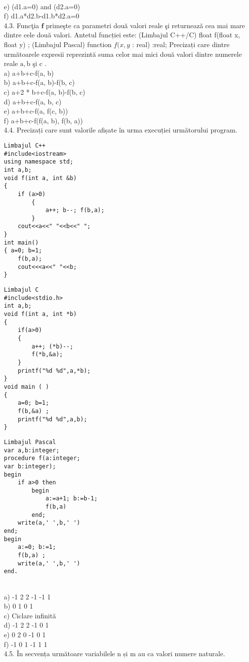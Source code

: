 \\
e) (d1.a=0) and (d2.a=0)
\\
f) d1.a*d2.b-d1.b*d2.a=0
\\
4.3. Funcţia $\mathbf{f}$ primeşte ca parametri două valori reale şi returnează cea mai mare dintre cele două valori. Antetul funcției este:
(Limbajul C++/C) float f(float x, float y) ;
(Limbajul Pascal) function $f(x, y$ : real) :real;
Precizați care dintre următoarele expresii reprezintă suma celor mai mici două valori dintre numerele reale $\mathrm{a}, \mathrm{b}$ şi c .
\\
a) a+b+c-f(a, b)
\\
b) a+b+c-f(a, b)-f(b, c)
\\
c) a+2 * b+c-f(a, b)-f(b, c)
\\
d) a+b+c-f(a, b, c)
\\
e) a+b+c-f(a, f(c, b))
\\
f) a+b+c-f(f(a, b), f(b, a))
\\
4.4. Precizați care sunt valorile afișate în urma execuției următorului program.
\begin{verbatim}
Limbajul C++
#include<iostream>
using namespace std;
int a,b;
void f(int a, int &b)
{
    if (a>0)
        {
            a++; b--; f(b,a);
        }
    cout<<a<<" "<<b<<" ";
}
int main()
{ a=0; b=1;
    f(b,a);
    cout<<<a<<" "<<b;
}
\end{verbatim}
\begin{verbatim}
Limbajul C
#include<stdio.h>
int a,b;
void f(int a, int *b)
{
    if(a>0)
    {
        a++; (*b)--;
        f(*b,&a);
    }
    printf("%d %d",a,*b);
}
void main ( )
{
    a=0; b=1;
    f(b,&a) ;
    printf("%d %d",a,b);
}
\end{verbatim}
\begin{verbatim}
Limbajul Pascal
var a,b:integer;
procedure f(a:integer;
var b:integer);
begin
    if a>0 then
        begin
            a:=a+1; b:=b-1;
            f(b,a)
        end;
    write(a,' ',b,' ')
end;
begin
    a:=0; b:=1;
    f(b,a) ;
    write(a,' ',b,' ')
end.
\end{verbatim}
\\
a) -1 2 2 -1 -1 1
\\
b) 0 1 0 1
\\
c) Ciclare infinită
\\
d) -1 2 2 -1 0 1
\\
e) 0 2 0 -1 0 1
\\
f) -1 0 1 -1 1 1
\\
4.5. În secvența următoare variabilele n și m au ca valori numere naturale.
